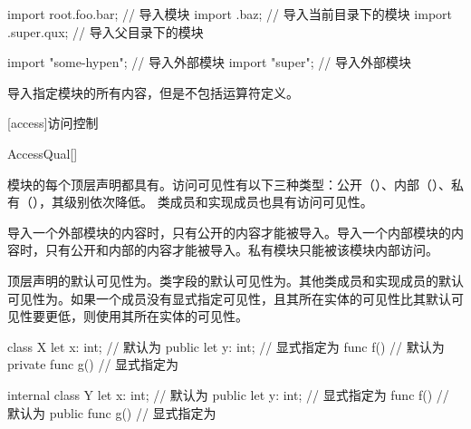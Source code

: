 \enterexample
\begin{codeblock}
import root.foo.bar; // 导入模块
import .baz; // 导入当前目录下的模块
import .super.qux; // 导入父目录下的模块

import "some-hypen"; // 导入外部模块
import "super"; // 导入外部模块
\end{codeblock}
\exitexample

\pnum
\tcode{*}导入指定模块的所有内容，但是不包括运算符定义。

[access]{访问控制}

\begin{bnf}{AccessQual}[\oneof]
\end{bnf}

\pnum
模块的每个顶层声明都具有。访问可见性有以下三种类型：公开（）、内部（）、私有（），其级别依次降低。
类成员和实现成员也具有访问可见性。

\pnum
导入一个外部模块的内容时，只有公开的内容才能被导入。导入一个内部模块的内容时，只有公开和内部的内容才能被导入。私有模块只能被该模块内部访问。

\pnum
顶层声明的默认可见性为。类字段的默认可见性为。其他类成员和实现成员的默认可见性为。如果一个成员没有显式指定可见性，且其所在实体的可见性比其默认可见性要更低，则使用其所在实体的可见性。

\enterexample
\begin{codeblock}
class X {
    let x: int; // 默认为
    public let y: int; // 显式指定为
    func f() {} // 默认为
    private func g() {} // 显式指定为
}

internal class Y {
    let x: int; // 默认为
    public let y: int; // 显式指定为
    func f() {} // 默认为
    public func g() {} // 显式指定为
}
\end{codeblock}